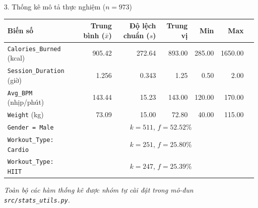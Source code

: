 \documentclass[aspectratio=169, 10pt]{beamer}
\begin{document}
\begin{frame}{3. Thống kê mô tả thực nghiệm ($n = 973$)}
    \begin{table}[H]
    \centering\footnotesize
    \begin{tabular}{lrrrrrr}
    \toprule
    \textbf{Biến số} & \textbf{Trung bình ($\bar{x}$)} & \textbf{Độ lệch chuẩn ($s$)} & \textbf{Trung vị} & \textbf{Min} & \textbf{Max} \\
    \midrule
    \texttt{Calories\_Burned} (kcal) & 905.42 & 272.64 & 893.00 & 285.00 & 1650.00 \\
    \texttt{Session\_Duration} (giờ) & 1.256 & 0.343 & 1.25 & 0.50 & 2.00 \\
    \texttt{Avg\_BPM} (nhịp/phút) & 143.44 & 15.23 & 143.00 & 120.00 & 170.00 \\
    \texttt{Weight} (kg) & 73.09 & 15.00 & 72.80 & 40.00 & 115.00 \\
    \midrule
    \texttt{Gender = Male} & \multicolumn{5}{c}{$k = 511$, $f = 52.52\%$} \\
    \texttt{Workout\_Type: Cardio} & \multicolumn{5}{c}{$k = 251$, $f = 25.80\%$} \\
    \texttt{Workout\_Type: HIIT} & \multicolumn{5}{c}{$k = 247$, $f = 25.39\%$} \\
    \bottomrule
    \end{tabular}
    \end{table}
    \textit{Toàn bộ các hàm thống kê được nhóm tự cài đặt trong mô-đun \texttt{src/stats\_utils.py}.}
\end{frame}
\end{document}
